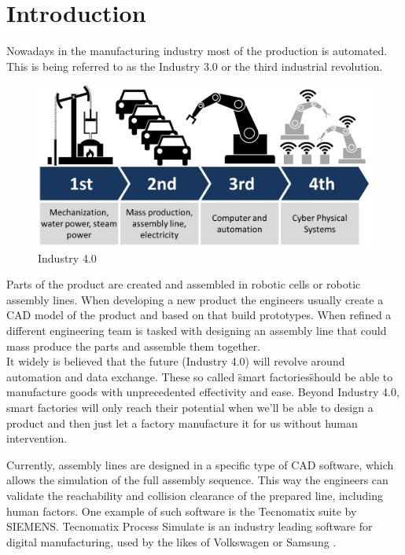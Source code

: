 \chapter{Introduction}
\graphicspath{ {chapters/Introduction/} }

Nowadays in the manufacturing industry most of the production is automated. This is being referred to as the Industry 3.0 or the third industrial revolution. \\ 

\begin{figure}[h]
	\caption{Industry 4.0 \cite{pictIndustry40}}
	\centering
	  \includegraphics[width=1\textwidth]{industry-40.png}
\end{figure}

	
 Parts of the product are created and assembled in robotic cells or robotic assembly lines. When developing a new product the engineers usually create a CAD model of the product and based on that build prototypes. When refined a different engineering team is tasked with designing an assembly line that could mass produce the parts and assemble them together. \\
 
It widely is believed that the future (Industry 4.0) will revolve around automation and data exchange. These so called \"smart factories\" should be able to manufacture goods with unprecedented effectivity and ease. Beyond Industry 4.0, smart factories will only reach their potential when we'll be able to design a product and then just let a factory manufacture it for us without human intervention.   

Currently, assembly lines are designed in a specific type of CAD software, which allows the simulation of the full assembly sequence. This way the engineers can validate the reachability and collision clearance of the prepared line, including human factors. One example of such software is the Tecnomatix suite by SIEMENS. Tecnomatix Process Simulate is an industry leading software for digital manufacturing, used by the likes of Volkswagen or Samsung \cite{TecnomatixCustomers}. \\ 

